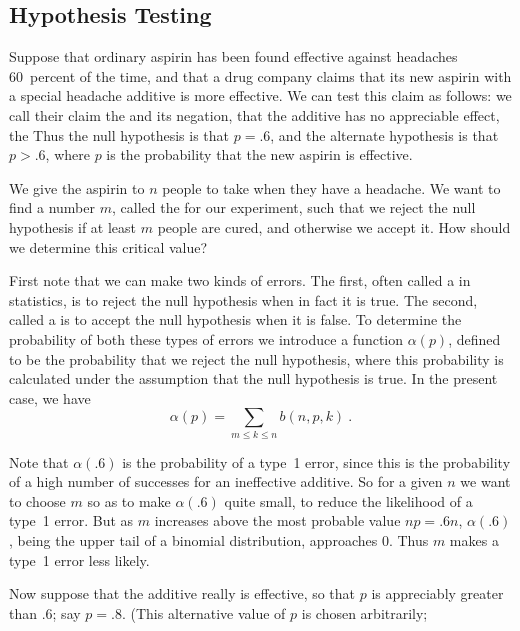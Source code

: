 \subsection*{Hypothesis Testing}

\begin{example}\label{exam 3.12} Suppose that ordinary aspirin has been found
effective against headaches 60~percent of the time, and that a drug company claims
that its new aspirin with a special headache additive is more effective.  We can test
this claim as follows: we call their claim the  and its
negation, that the additive has no appreciable effect, the   Thus
the null hypothesis is that $p = .6$, and the alternate hypothesis is that $p > .6$,
where $p$ is the probability that the new aspirin is effective.
\par We give the aspirin to $n$ people to take when they have a headache.  We want to
find a number $m$, called the  for our experiment, such that we
reject the null hypothesis if at least $m$ people are cured,  and otherwise we accept
it.  How should we determine this critical value?
\par First note that we can make two kinds of errors.  The first, often called a  in statistics, is to reject the null
hypothesis when in fact it is true.  The second, called a  is
to accept the null hypothesis when it is false.  To determine the probability of both these types of
errors we introduce a function $\alpha(p)$, defined to be the
probability that we reject the null hypothesis, where this probability is calculated under
the assumption that the null hypothesis is true.  In the present case, we have
$$\alpha(p)  =  \sum_{m \leq k \leq n} b(n,p,k)\ .$$
\par 
Note that $\alpha(.6)$ is the probability of a type~1 error, since this is the
probability of a high number of successes for an ineffective additive.  So for a given
$n$ we want to choose $m$ so as to make $\alpha(.6)$ quite small, to reduce the
likelihood of a type~1 error.  But as $m$ increases above the most probable value $np
= .6n$, $\alpha(.6)$, being the upper tail of a binomial distribution, approaches 0. 
Thus  $m$ makes a type~1 error less likely.
\par Now suppose that the additive really is effective, so that $p$ is appreciably
greater than .6; say $p = .8$.  (This alternative value of $p$ is chosen arbitrarily;

\end{example}
